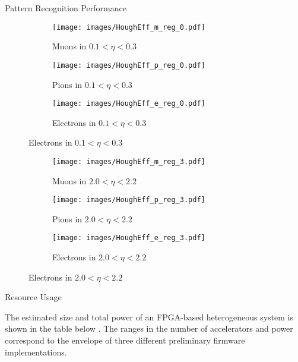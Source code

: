 \documentclass[final]{beamer}
\newlength{\colwidth}
\begin{document}
\begin{frame}[t]
\begin{columns}[t]
\begin{column}{\colwidth}
\begin{block}{Pattern Recognition Performance}
    \begin{figure}[!h]
      \centering
      \begin{subfigure}[t]{.3\textwidth}
          \centering
          \texttt{[image: images/HoughEff\_m\_reg\_0.pdf]}
          \caption*{Muons in $0.1 < \eta < 0.3$}
      \end{subfigure}
      \begin{subfigure}[t]{.3\textwidth}
         \centering
         \texttt{[image: images/HoughEff\_p\_reg\_0.pdf]}
         \caption*{Pions in $0.1 < \eta < 0.3$}
      \end{subfigure}
      \begin{subfigure}[t]{.3\textwidth}
        \centering
        \texttt{[image: images/HoughEff\_e\_reg\_0.pdf]}
        \caption*{Electrons in $0.1 < \eta < 0.3$}
     \end{subfigure}
    \end{figure}

    \begin{figure}[!h]
      \centering
      \begin{subfigure}[t]{.3\textwidth}
          \centering
          \texttt{[image: images/HoughEff\_m\_reg\_3.pdf]}
          \caption*{Muons in $2.0 < \eta < 2.2$}
      \end{subfigure}
      \begin{subfigure}[t]{.3\textwidth}
         \centering
         \texttt{[image: images/HoughEff\_p\_reg\_3.pdf]}
         \caption*{Pions in $2.0 < \eta < 2.2$}
      \end{subfigure}
      \begin{subfigure}[t]{.3\textwidth}
        \centering
        \texttt{[image: images/HoughEff\_e\_reg\_3.pdf]}
        \caption*{Electrons in $2.0 < \eta < 2.2$}
     \end{subfigure}
    \end{figure}

  \end{block}

  \begin{block}{Resource Usage}

    The estimated size and total power of an FPGA-based heterogeneous system is shown in the table below \cite{TDR_Amend}.
    The ranges in the number of accelerators and power correspond to the envelope of three different preliminary firmware implementations. 
    

\end{block}
\end{column}
\end{columns}
\end{frame}
\end{document}
